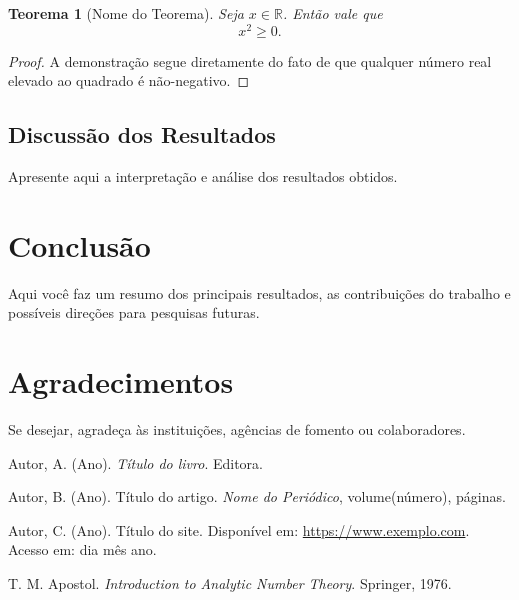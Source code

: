 \documentclass[a4paper,11pt]{article}
\newtheorem{theorem}{Teorema}[section]
\theoremstyle{definition}
\theoremstyle{remark}
\begin{document}
	
	
	\begin{theorem}[Nome do Teorema]
		Seja $x \in \mathbb{R}$. Então vale que
		\[
		x^2 \geq 0.
		\]
	\end{theorem}
	
	\begin{proof}
		A demonstração segue diretamente do fato de que qualquer número real elevado ao quadrado é não-negativo.
	\end{proof}
	
	\subsection{Discussão dos Resultados}
	
	Apresente aqui a interpretação e análise dos resultados obtidos.
	
	\section{Conclusão}
	
	Aqui você faz um resumo dos principais resultados, as contribuições do trabalho e possíveis direções para pesquisas futuras.
	
	\section*{Agradecimentos}
	
	Se desejar, agradeça às instituições, agências de fomento ou colaboradores.
	
	\begin{thebibliography}{9}
		
		Autor, A. (Ano). \textit{Título do livro}. Editora.
		
		Autor, B. (Ano). Título do artigo. \textit{Nome do Periódico}, volume(número), páginas.
		
		Autor, C. (Ano). Título do site. Disponível em: \url{https://www.exemplo.com}. Acesso em: dia mês ano.
		
		T. M. Apostol.
		\textit{Introduction to Analytic Number Theory}.
		Springer, 1976.
		
	\end{thebibliography}
	
\end{document}
